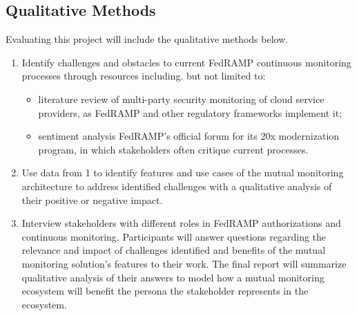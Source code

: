 \documentclass{jdf}
\begin{document}
\subsection*{Qualitative Methods}

Evaluating this project will include the qualitative methods below.

\begin{enumerate}
  \item Identify challenges and obstacles to current FedRAMP continuous monitoring processes through resources including. but not limited to:
  \begin{itemize}
    \item literature review of multi-party security monitoring of cloud service providers, as FedRAMP and other regulatory frameworks implement it;
    \item sentiment analysis FedRAMP's official forum for its 20x modernization program, in which stakeholders often critique current processes.
  \end{itemize}
  \item Use data from 1 to identify features and use cases of the mutual monitoring architecture to address identified challenges with a qualitative analysis of their positive or negative impact.
  \item Interview stakeholders with different roles in FedRAMP authorizations and continuous monitoring. Participants will answer questions regarding the relevance and impact of challenges identified and benefits of the mutual monitoring solution's features to their work. The final report will summarize qualitative analysis of their answers to model how a mutual monitoring ecosystem will benefit the persona the stakeholder represents in the ecosystem.
\end{enumerate}
\end{document}
